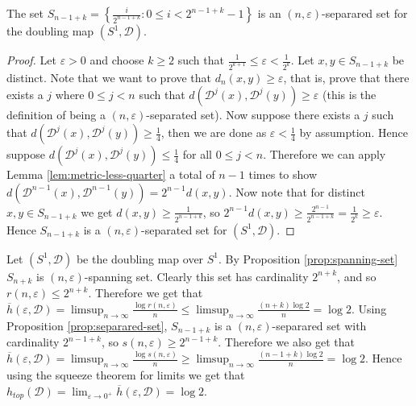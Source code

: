 \begin{prop} \label{prop:separared-set}
    The set $S_{n-1+k} = \left\lbrace \frac{i}{2^{n-1+k}} : 0 \leq i < 2^{n - 1 + k} - 1 \right\rbrace$ is an $(n, \varepsilon)$-separared set for the doubling map $(S^1, \mathcal{D})$. 
    \begin{proof}
        Let $\varepsilon > 0$ and choose $k \geq 2$ such that $\frac{1}{2^{k+1}} \leq \varepsilon < \frac{1}{2^k}$. Let $x, y \in S_{n-1+k}$ be distinct. Note that we want to prove that $d_n(x, y) \geq \varepsilon$, that is, prove that there exists a $j$ where $0 \leq j < n$ such that $d(\mathcal{D}^j(x), \mathcal{D}^j(y)) \geq \varepsilon$ (this is the definition of being a $(n, \varepsilon)$-separated set). Now suppose there exists a $j$ such that $d(\mathcal{D}^j(x), \mathcal{D}^j(y)) \geq \frac{1}{4}$, then we are done as $\varepsilon < \frac{1}{4}$ by assumption. Hence suppose $d(\mathcal{D}^j(x), \mathcal{D}^j(y)) \leq \frac{1}{4}$ for all $0 \leq j < n$. Therefore we can apply Lemma \ref{lem:metric-less-quarter} a total of $n - 1$ times to show $d(\mathcal{D}^{n-1}(x), \mathcal{D}^{n-1}(y)) = 2^{n-1}d(x, y)$. Now note that for distinct $x, y \in S_{n-1+k}$ we get $d(x, y) \geq \frac{1}{2^{n-1+k}}$, so $2^{n-1}d(x, y) \geq \frac{2^{n-1}}{2^{n-1+k}} = \frac{1}{2^k} \geq \varepsilon$. Hence $S_{n-1+k}$ is a $(n, \varepsilon)$-separated set for $(S^1, \mathcal{D})$.
    \end{proof}
\end{prop}

\begin{exmp} \label{exmp:s1-doubling-entropy}
    Let $(S^1, \mathcal{D})$ be the doubling map over $S^1$. By Proposition \ref{prop:spanning-set} $S_{n+k}$ is $(n, \varepsilon)$-spanning set. Clearly this set has cardinality $2^{n+k}$, and so $r(n, \varepsilon) \leq 2^{n+k}$. Therefore we get that $\overline{h}(\varepsilon, \mathcal{D}) = \limsup_{n \to \infty}\frac{\log{r(n, \varepsilon)}}{n} \leq \limsup_{n\to\infty}\frac{(n + k)\log 2}{n} = \log 2$. Using Proposition \ref{prop:separared-set}, $S_{n - 1 + k}$ is a $(n, \varepsilon)$-separared set with cardinality $2^{n - 1 + k}$, so $s(n, \varepsilon) \geq 2^{n - 1 + k}$. Therefore we also get that $\overline{h}(\varepsilon, \mathcal{D}) = \limsup_{n \to \infty}\frac{\log s(n, \varepsilon)}{n} \geq \limsup_{n \to \infty}\frac{(n - 1 + k)\log 2}{n} = \log 2$. Hence using the squeeze theorem for limits we get that $h_{top}(\mathcal{D}) = \lim_{\varepsilon \to 0^+}\overline{h}(\varepsilon, \mathcal{D}) = \log 2$.
\end{exmp}

